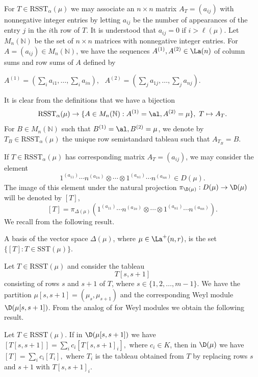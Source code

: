 For $T \in \mathrm{RSST}_{\alpha}(\mu)$ we may associate an $n \times n$ matrix $A_T=(a_{ij})$ with nonnegative integer entries by letting $a_{ij}$ be the number of appearances of the entry $j$ in the $i$th row of $T$. It is understood that $a_{ij}=0$ if $i>\ell(\mu)$. Let  $M_{n}(\mathbb{N})$ be the set of $n \times n$ matrices with nonnegative integer entries.  For $A=(a_{ij}) \in M_{n}(\mathbb{N})$, we have the sequences $A^{(1)}, A^{(2)} \in \La(n)$ of column sums and row sums of $A$ defined by \begin{center}
	$A^{(1)}=(\sum_ia_{i1},\dots,\sum_ia_{in})$, \  $A^{(2)}=(\sum_ja_{1j},\dots,\sum_ja_{nj})$.
\end{center} It is clear from the definitions that we have a bijection \begin{equation}\label{bijection1}\mathrm{RSST}_{\alpha}(\mu) \to \{A \in M_{n}(\mathbb{N}): A^{(1)} =\al, A^{(2)} =\mu \},\  T \mapsto A_T.\end{equation} For $B \in  M_{n}(\mathbb{N})$ such that $B^{(1)} =\al, B^{(2)} =\mu$, we denote by $T_B \in \mathrm{RSST}_{\alpha}(\mu)$ the unique row semistandard tableau such that $A_{T_B}=B$. 

If $T \in \mathrm{RSST}_{\alpha}(\mu)$ has corresponding matrix $A_T=(a_{ij})$, we may consider the element \[1^{(a_{11})} \cdots n^{(a_{1n})} \otimes \cdots \otimes 1^{(a_{n1})} \cdots n^{(a_{nn})} \in D(\mu).\] The image of this element under the natural projection ${\pi}_{\D(\mu)} : D(\mu) \to \D(\mu)$ will be denoted by $[T]$, \[[T]=\pi_{\Delta(\mu)}(1^{(a_{11})} \cdots n^{(a_{1n})} \otimes \cdots \otimes 1^{(a_{n1})} \cdots n^{(a_{nn})}).\] We recall from \cite{ABW} the following result.
\begin{theorem}\label{standard}
	A basis of the vector space $\Delta(\mu)$, where $\mu \in \La^{+}(n,r)$, is the set $\{[T]: T \in \mathrm{SST}(\mu)\}.$
\end{theorem}
Let $T \in \mathrm{RSST}(\mu)$ and consider the tableau \[T[s,s+1]\] consisting of rows $s$ and $s+1$ of $T$, where $s \in \{1,2,\dots,m-1\}$. We have the partition $\mu[s,s+1]=(\mu_s, \mu_{s+1})$ and the corresponding Weyl module $\D(\mu[s,s+1])$. From the analog of \cite[Lemma II.2.3]{ABW} for Weyl modules we obtain the following result.
\begin{lemma}\label{insertrows}
Let $T \in \mathrm{RSST}(\mu)$. If in $\D(\mu[s,s+1])$ we have $[T[s,s+1]]=\sum_ic_i[T[s,s+1]_i],$ where $c_i \in K$, then in $\D(\mu)$ we have $[T]=\sum_ic_i[T_i],$ where $T_i$ is the tableau obtained from $T$ by replacing rows $s$ and $s+1$ with $T[s,s+1]_i$.
\end{lemma}
